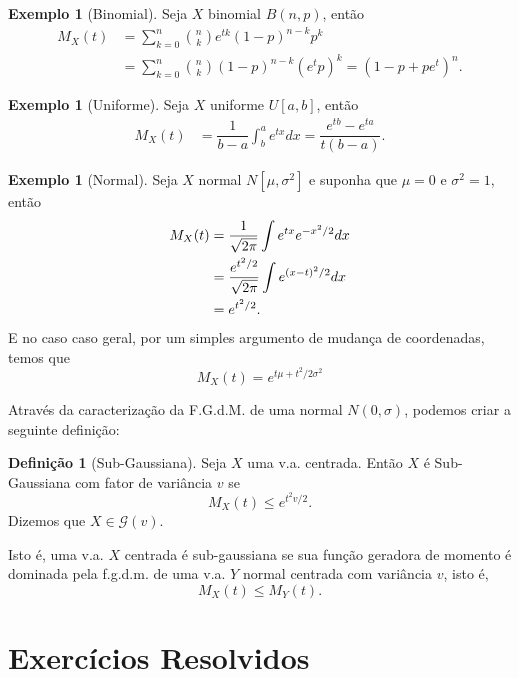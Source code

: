 \documentclass[12pt,a4paper,oneside]{book}
\theoremstyle{definition}
\newtheorem{definition}[theorem]{Defini\c{c}\~ao}
\newtheorem{example}[theorem]{Exemplo}
\theoremstyle{remark}
\numberwithin{equation}{section}
\begin{document}
\begin{example}[Binomial] Seja $X$ binomial $B(n,p)$, então
\begin{align*}
M_X(t)  &= \sum_{k=0}^n {n\choose k} e^{tk}(1-p)^{n-k}p^k\\
		&= \sum_{k=0}^n {n\choose k} (1-p)^{n-k}(e^tp)^k = (1-p+  pe^t )^n.
\end{align*}
\end{example}


\begin{example}[Uniforme] Seja $X$ uniforme $U[a,b]$, então
\begin{align*}
M_X(t)  &= \dfrac{1}{b-a}\int_b^a e^{tx} dx =  \dfrac{e^{tb}-e^{ta}}{t(b-a)}.
\end{align*}
\end{example}


\begin{example}[Normal] Seja $X$ normal $N[\mu,\sigma^2]$ e suponha que $\mu=0$ e $\sigma^2=1$, então
\begin{align*}
M_X(t)  &= \dfrac{1}{\sqrt{2\pi}}\int e^{tx} e^{-x^2 / 2} dx \\
	&= \dfrac{e^{t^2 / 2}}{\sqrt{2\pi}}  \int  e^{\-(x-t)^2/2} dx \\
	&= e^{t^2/2}.
\end{align*}
E no caso caso geral, por um simples argumento de mudança de coordenadas, temos que
$$M_X(t) = e^{t\mu + t^2/2\sigma^2}$$
\end{example}



\begin{tcolorbox}
Através da caracterização da F.G.d.M. de uma normal $N(0,\sigma)$, podemos criar a seguinte definição:

\begin{definition}[Sub-Gaussiana]\label{Subgauss}
Seja $X$ uma v.a. centrada. Então $X$ é Sub-Gaussiana com fator de variância $v$ se 
$$M_X(t)\leq e^{ t^2 v/2}. $$
Dizemos que $X\in \mathcal{G}(v).$
\end{definition} 
Isto é, uma  v.a. $X$ centrada é sub-gaussiana se sua função geradora de momento é dominada pela f.g.d.m. de uma v.a. $Y$ normal centrada com variância $v$, isto é, 
$$M_X(t)\leq M_Y(t) .$$ 
\end{tcolorbox}



\newpage
\section{Exercícios Resolvidos}
\end{document}
